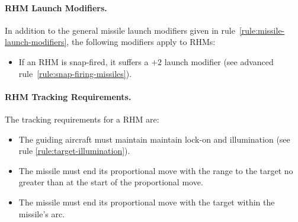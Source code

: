 {\paragraph{RHM Launch Modifiers.}
\label{rule:rhm-launch-modifiers}

In addition to the general missile launch modifiers given in rule~\ref{rule:missile-launch-modifiers}, the following modifiers apply to RHMs:

\begin{itemize}
    \item If an RHM is snap-fired, it suffers a $+2$ launch modifier (see advanced rule~\ref{rule:snap-firing-missiles}).
\end{itemize}

\paragraph{RHM Tracking Requirements.} 
\label{rule:rhm-tracking-requirements}

The tracking requirements for a RHM are:

\begin{itemize}

    \item The guiding aircraft must maintain maintain lock-on and illumination (see rule \ref{rule:target-illumination}).

    \item The missile must end its proportional move with the range to the target no greater than at the start of the proportional move.

    \item The missile must end its proportional move with the target within the missile's  arc.

\end{itemize}

}

